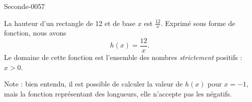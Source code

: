 
\begin{corrige}{Seconde-0057}

    La hauteur d'un rectangle de \unit{12}{\centi\meter\squared} et de base \( x\) est \( \frac{ 12 }{ x }\)\unit{}{\centi\meter}. Exprimé sous forme de fonction, nous avons
    \begin{equation}
        h(x)=\frac{ 12 }{ x }.
    \end{equation}
    Le domaine de cette fonction est l'ensemble des nombres \emph{strictement} positifs : \( x>0\).

    Note : bien entendu, il est possible de calculer la valeur de \( h(x)\) pour \( x=-1\), mais la fonction représentant des longueurs, elle n'accepte pas les négatifs.

\end{corrige}
